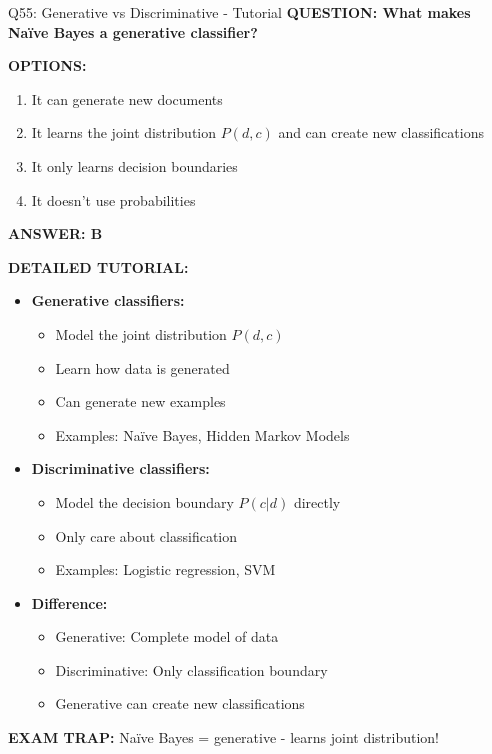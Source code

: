 \documentclass[8pt]{beamer}
\begin{document}
	\begin{frame}{Q55: Generative vs Discriminative - Tutorial}
		\fontsize{6.5}{7.5}\selectfont
		\textbf{QUESTION: What makes Naïve Bayes a generative classifier?}
		
		\vspace{0.1cm}
		\textbf{OPTIONS:}
		\begin{enumerate}
			\item It can generate new documents
			\item It learns the joint distribution $P(d,c)$ and can create new classifications
			\item It only learns decision boundaries
			\item It doesn't use probabilities
		\end{enumerate}
		
		\vspace{0.1cm}
		\textcolor{myblue}{\textbf{ANSWER: B}}
		
		\vspace{0.1cm}
		\textbf{DETAILED TUTORIAL:}
		\begin{itemize}
			\item \textbf{Generative classifiers:}
			\begin{itemize}
				\item Model the joint distribution $P(d,c)$
				\item Learn how data is generated
				\item Can generate new examples
				\item Examples: Naïve Bayes, Hidden Markov Models
			\end{itemize}
			\item \textbf{Discriminative classifiers:}
			\begin{itemize}
				\item Model the decision boundary $P(c|d)$ directly
				\item Only care about classification
				\item Examples: Logistic regression, SVM
			\end{itemize}
			\item \textbf{Difference:}
			\begin{itemize}
				\item Generative: Complete model of data
				\item Discriminative: Only classification boundary
				\item Generative can create new classifications
			\end{itemize}
		\end{itemize}
		
		\textcolor{myred}{\textbf{EXAM TRAP:}} Naïve Bayes = \textcolor{myblue}{generative} - learns joint distribution!
	\end{frame}
	
\end{document}
